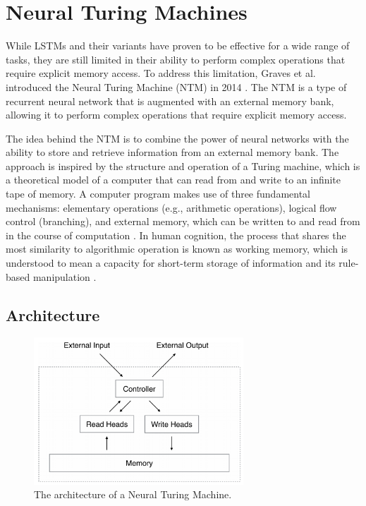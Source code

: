 \documentclass{article}
\begin{document}
\section{Neural Turing Machines}
\label{ch:4}


While LSTMs and their variants have proven to be effective for a wide range of tasks, they
are still limited in their ability to perform complex operations that require explicit
memory access. To address this limitation, Graves et al. introduced the Neural Turing
Machine (NTM) in 2014 \cite{gravesNeuralTuringMachines2014}. The NTM is a type of
recurrent neural network that is augmented with an external memory bank, allowing it to
perform complex operations that require explicit memory access.

The idea behind the NTM is to combine the power of neural networks with the ability to
store and retrieve information from an external memory bank. The approach is inspired by
the structure and operation of a Turing machine, which is a theoretical model of a
computer that can read from and write to an infinite tape of memory. A computer program
makes use of three fundamental mechanisms: elementary operations (e.g., arithmetic
operations), logical flow control (branching), and external memory, which can be written
to and read from in the course of computation \cite{von_neumann_first_1945}. In human
cognition, the process that shares the most similarity to algorithmic operation is known
as working memory, which is understood to mean a capacity for short-term storage of
information and its rule-based manipulation \cite{baddeley_memory_2009}.



\subsection{Architecture}
\label{sec:4.0}

\begin{figure}[htbp]
  \centering
  \includegraphics[width=0.7\textwidth]{NTM Structure.png}
  \caption{The architecture of a Neural Turing Machine.}
  \label{fig:ntm-structure}
\end{figure}
\end{document}
